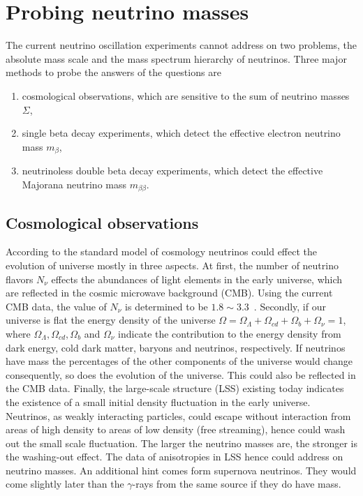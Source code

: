 \section{Probing neutrino masses}
\label{sec:pnm}
The current neutrino oscillation experiments cannot address on two problems, the absolute mass scale and the mass spectrum hierarchy of neutrinos. Three major methods to probe the answers of the questions are 
\begin{enumerate}
\item cosmological observations, which are sensitive to the sum of neutrino masses $\Sigma$,
\item single beta decay experiments, which detect the effective   electron neutrino mass $m_{\beta}$,
\item neutrinoless double beta decay experiments, which detect the effective Majorana neutrino mass $m_{\beta\beta}$.
\end{enumerate}

\subsection{Cosmological observations}
\label{sec:coob}
According to the standard model of cosmology neutrinos could effect the evolution of universe mostly in three aspects. At first, the number of neutrino flavors $N_{\nu}$ effects the abundances of light elements in the early universe, which are reflected in the cosmic microwave background (CMB). Using the current CMB data, the value of $N_{\nu}$ is determined to be $1.8 \sim 3.3$~\cite{Oli02}. Secondly, if our universe is flat the energy density of the universe $\Omega = \Omega_{\Lambda} + \Omega_{cd} + \Omega_{b} + \Omega_{\nu} = 1$, where $\Omega_{\Lambda}, \Omega_{cd}, \Omega_{b}$ and $\Omega_{\nu}$ indicate the contribution to the energy density from dark energy, cold dark matter, baryons and neutrinos, respectively. If neutrinos have mass the percentages of the other components of the universe would change consequently, so does the evolution of the universe. This could also be reflected in the CMB data. Finally, the large-scale structure (LSS) existing today indicates the existence of a small initial density fluctuation in the early universe. Neutrinos, as weakly interacting particles, could escape without interaction from areas of high density to areas of low density (free streaming), hence could wash out the small scale fluctuation. The larger the neutrino masses are, the stronger is the washing-out effect. The data of anisotropies in LSS hence could address on neutrino masses. An additional hint comes form supernova neutrinos. They would come slightly later than the $\gamma$-rays from the same source if they do have mass.

